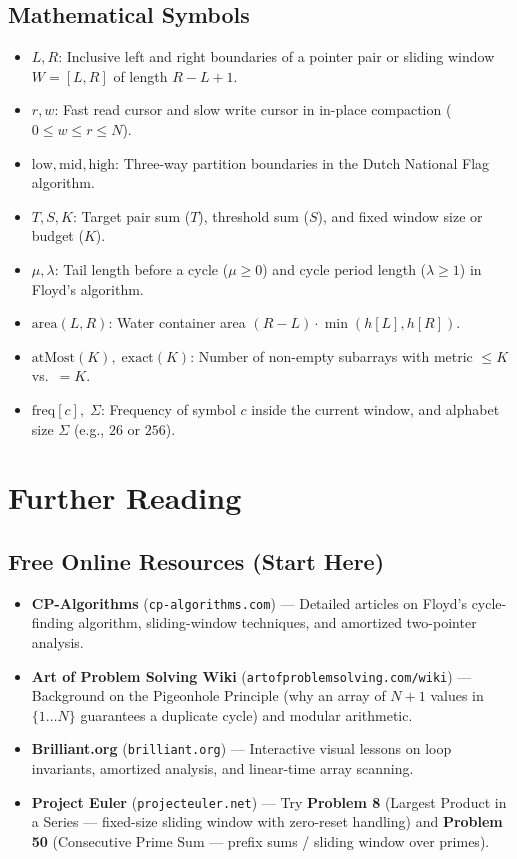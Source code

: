 \documentclass[11pt,a4paper]{article}
\theoremstyle{definition}
\begin{document}
\subsection*{Mathematical Symbols}
\begin{itemize}[itemsep=2pt]
    \item $L, R$: Inclusive left and right boundaries of a pointer pair or sliding window $W = [L, R]$ of length $R - L + 1$.
    \item $r, w$: Fast read cursor and slow write cursor in in-place compaction ($0 \le w \le r \le N$).
    \item $\text{low}, \text{mid}, \text{high}$: Three-way partition boundaries in the Dutch National Flag algorithm.
    \item $T, S, K$: Target pair sum ($T$), threshold sum ($S$), and fixed window size or budget ($K$).
    \item $\mu, \lambda$: Tail length before a cycle ($\mu \ge 0$) and cycle period length ($\lambda \ge 1$) in Floyd's algorithm.
    \item $\text{area}(L, R)$: Water container area $(R - L) \cdot \min(h[L], h[R])$.
    \item $\text{atMost}(K),\; \text{exact}(K)$: Number of non-empty subarrays with metric $\le K$ vs.\ $= K$.
    \item $\text{freq}[c],\; \Sigma$: Frequency of symbol $c$ inside the current window, and alphabet size $\Sigma$ (e.g., $26$ or $256$).
\end{itemize}

\section{Further Reading}

\subsection*{Free Online Resources (Start Here)}
\begin{itemize}
    \item \textbf{CP-Algorithms} (\texttt{cp-algorithms.com}) --- Detailed articles on Floyd's cycle-finding algorithm, sliding-window techniques, and amortized two-pointer analysis.
    \item \textbf{Art of Problem Solving Wiki} (\texttt{artofproblemsolving.com/wiki}) --- Background on the Pigeonhole Principle (why an array of $N+1$ values in $\{1 \dots N\}$ guarantees a duplicate cycle) and modular arithmetic.
    \item \textbf{Brilliant.org} (\texttt{brilliant.org}) --- Interactive visual lessons on loop invariants, amortized analysis, and linear-time array scanning.
    \item \textbf{Project Euler} (\texttt{projecteuler.net}) --- Try \textbf{Problem 8} (Largest Product in a Series --- fixed-size sliding window with zero-reset handling) and \textbf{Problem 50} (Consecutive Prime Sum --- prefix sums / sliding window over primes).
\end{itemize}
\end{document}
